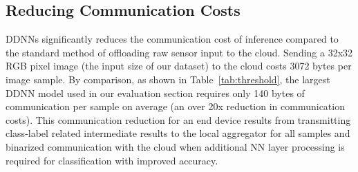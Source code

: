 \documentclass[10pt, conference, compsocconf]{IEEEtran}
\begin{document}

\subsection{Reducing Communication Costs}
\label{sec:comm}
DDNNs significantly reduces the communication cost of inference compared to the standard method of offloading raw sensor input to the cloud. Sending a 32x32 RGB pixel image (the input size of our dataset) to the cloud costs 3072 bytes per image sample. By comparison, as shown in Table~\ref{tab:threshold}, the largest DDNN model used in our evaluation section requires only 140 bytes of communication per sample on average (an over 20x reduction in communication costs). This communication reduction for an end device results from transmitting class-label related intermediate results to the local aggregator for all samples and binarized communication with the cloud when additional NN layer processing is required for classification with improved accuracy.


\end{document}
